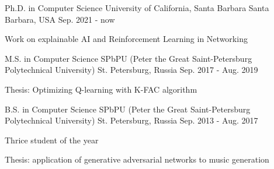 

\begin{cventries}

  \cventry
	{Ph.D. in Computer Science} %
	{University of California, Santa Barbara} %
	{Santa Barbara, USA} %
	{Sep. 2021 - now} %
	{
	  	\begin{cvitems} %
	  		\item {Work on explainable AI and Reinforcement Learning in Networking}
	  	\end{cvitems}
	}
  
  \cventry
	{M.S. in Computer Science} %
	{SPbPU (Peter the Great Saint-Petersburg Polytechnical University)} %
	{St. Petersburg, Russia} %
	{Sep. 2017 - Aug. 2019} %
	{
	 	\begin{cvitems} %
	 		\item {Thesis: Optimizing Q-learning with K-FAC algorithm}
	 	\end{cvitems}
	}
    

  \cventry
	{B.S. in Computer Science} %
	{SPbPU (Peter the Great Saint-Petersburg Polytechnical University)} %
	{St. Petersburg, Russia} %
	{Sep. 2013 - Aug. 2017} %
	{
		\begin{cvitems} %
			\item {Thrice student of the year}
			\item {Thesis: application of generative adversarial networks to music generation}
		\end{cvitems}
	}

\end{cventries}
